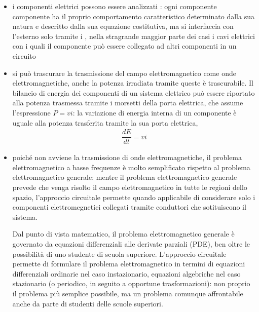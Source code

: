 \documentclass[letterpaper,10pt,italian]{jupyterBook}
\begin{document}
\begin{itemize}
\item {} 
\sphinxAtStartPar
i componenti elettrici possono essere analizzati : ogni componente componente ha il proprio comportamento caratteristico determinato dalla sua natura e descritto dalla sua equazione costitutiva, ma si interfaccia con l’esterno solo tramite i , nella stra\sphinxhyphen{}grande maggior parte dei casi i cavi elettrici con i quali il componente può essere collegato ad altri componenti in un circuito

\item {} 
\sphinxAtStartPar
si può trascurare la trasmissione del campo elettromagnetico come onde elettromagnetiche, anche la potenza irradiata tramite queste è trascurabile. Il bilancio di energia dei componenti di un sistema elettrico può essere riportato alla potenza trasmessa tramite i morsetti della porta elettrica, che assume l’espressione \(P = v i\): la variazione di energia interna di un componente è uguale alla potenza trasferita tramite la sua porta elettrica,
\begin{equation}\label{equation:ch/electromagnetism/circuits-electric:eq:el-circuit:power}
\begin{split}\dfrac{d E}{dt} = v i\end{split}
\end{equation}
\item {} 
\sphinxAtStartPar
poiché non avviene la trasmissione di onde elettromagnetiche, il problema elettromagnetico a basse frequenze è molto semplificato rispetto al problema elettromagnetico generale: mentre il problema elettromagnetico generale prevede che venga risolto il campo elettromagnetico in tutte le regioni dello spazio, l’approccio circuitale permette \sphinxhyphen{} quando applicabile \sphinxhyphen{} di considerare solo i componenti elettromegnetici collegati tramite conduttori che sotituiscono il sistema.%
\begin{footnote}[1]\sphinxAtStartFootnote
Dal punto di vista matematico, il problema elettromagnetico generale è governato da equazioni differenziali alle derivate parziali (PDE), ben oltre le possibilità di uno studente di scuola superiore. L’approccio circuitale permette di formulare il problema elettromagnetico in termini di equazioni differenziali ordinarie nel caso instazionario, equazioni algebriche nel caso stazionario (o periodico, in seguito a opportune trasformazioni): non proprio il problema più semplice possibile, ma un problema comunque affrontabile anche da parte di studenti delle scuole superiori.
%
\end{footnote}

\end{itemize}
\end{document}
